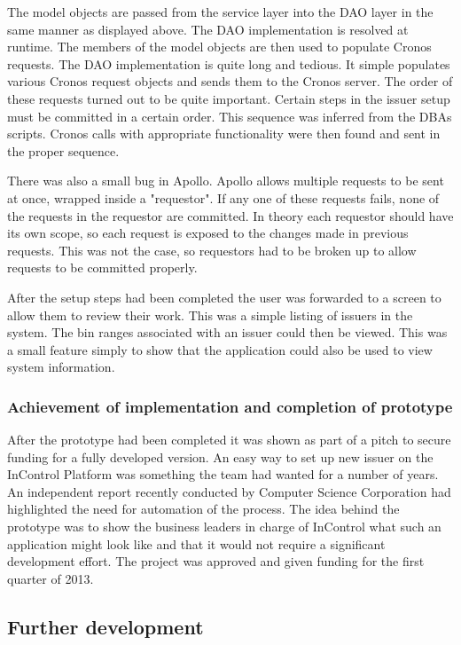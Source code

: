 \documentclass[a4paper, 11pt, titlepage]{article}
\begin{document}
The model objects are passed from the service layer into the DAO layer in the same manner as displayed above. The DAO implementation is resolved at runtime. The members of the model objects are then used to populate Cronos requests. The DAO implementation is quite long and tedious. It simple populates various Cronos request objects and sends them to the Cronos server. The order of these requests turned out to be quite important. Certain steps in the issuer setup must be committed in a certain order. This sequence was inferred from the DBAs scripts. Cronos calls with appropriate functionality were then found and sent in the proper sequence.  
 
There was also a small bug in Apollo. Apollo allows multiple requests to be sent at once, wrapped inside a "requestor". If any one of these requests fails, none of the requests in the requestor are committed. In theory each requestor should have its own scope, so each request is exposed to the changes made in previous requests. This was not the case, so requestors had to be broken up to allow requests to be committed properly. 
 
After the setup steps had been completed the user was forwarded to a screen to allow them to review their work. This was a simple listing of issuers in the system. The bin ranges associated with an issuer could then be viewed. This was a small feature simply to show that the application could also be used to view system information. 
 
\subsubsection{Achievement of implementation and completion of prototype} 
 
After the prototype had been completed it was shown as part of a pitch to secure funding for a fully developed version. An easy way to set up new issuer on the InControl Platform was something the team had wanted for a number of years. An independent report recently conducted by Computer Science Corporation had highlighted the need for automation of the process. The idea behind the prototype was to show the business leaders in charge of InControl what such an application might look like and that it would not require a significant development effort. The project was approved and given funding for the first quarter of 2013.  
 
\subsection{Further development} 
 
\end{document}
